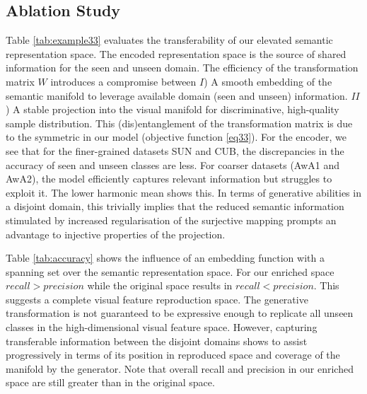 \documentclass{article}
\begin{document}
\subsection{Ablation Study}
Table \ref{tab:example33} evaluates the transferability of our elevated semantic representation space. The encoded representation space is the source of shared information for the seen and unseen domain. The efficiency of the transformation matrix $W$ introduces a compromise between $I$) A smooth embedding of the semantic manifold to leverage available domain (seen and unseen) information. $II$) A stable projection into the visual manifold for discriminative, high-quality sample distribution. This (dis)entanglement of the transformation matrix is due to the symmetric in our model (objective function \ref{eq33}). For the encoder, we see that for the finer-grained datasets SUN and CUB, the discrepancies in the accuracy of seen and unseen classes are less. For coarser datasets (AwA1 and AwA2), the model efficiently captures relevant information but struggles to exploit it. The lower harmonic mean shows this. In terms of generative abilities in a disjoint domain, this trivially implies that the reduced semantic information stimulated by increased regularisation of the surjective mapping prompts an advantage to injective properties of the projection.

Table \ref{tab:accuracy} shows the influence of an embedding function with a spanning set over the semantic representation space. For our enriched space $recall>precision$ while the original space results in $recall<precision$. This suggests a complete visual feature reproduction space. The generative transformation is not guaranteed to be expressive enough to replicate all unseen classes in the high-dimensional visual feature space. However, capturing transferable information between the disjoint domains shows to assist progressively in terms of its position in reproduced space and coverage of the manifold by the generator.
Note that overall recall and precision in our enriched space are still greater than in the original space.
\end{document}
